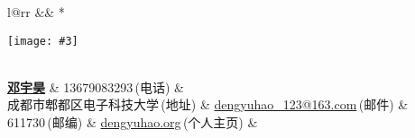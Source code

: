\newcommand{\paint}[3]{
    \begin{minipage}{#1}
        \texttt{[image: \#3]}
    \end{minipage} 
}
\newcommand{\myheader}{
\begin{tabular*}{\textwidth}{l@{\extracolsep{\fill}}rr}
  && \multirow{4}*{\paint{2.6cm}{3.2cm}{./image.jpg}}\\
  \specialrule{0em}{4pt}{4pt}
  \textbf{\href{http://www.dengyuhao.org}{\LARGE 邓宇昊}} & 13679083293$\,${\color{labelgrey}(电话)} &\\
  成都市郫都区电子科技大学$\,${\color{labelgrey}(地址)} & \href{mailto:dengyuhao\_123@163.com}{dengyuhao\_123@163.com}$\,${\color{labelgrey}(邮件)} & \\
  611730$\,${\color{labelgrey}(邮编)} & \href{http://www.dengyuhao.org}{dengyuhao.org}$\,${\color{labelgrey}(个人主页)} & \\
  \end{tabular*}\\\vspace{0.1in}
}

\myheader

